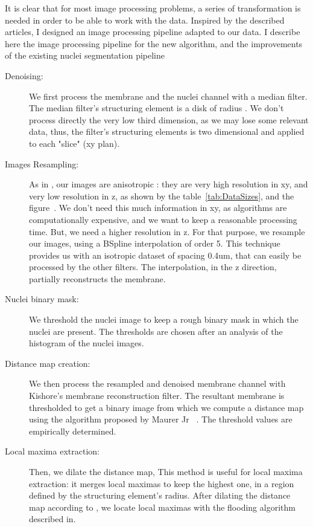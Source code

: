 It is clear that for most image processing problems, a series of transformation is needed in order to be able to work with the data.
Inspired by the described articles, I designed an image processing pipeline adapted to our data.
I describe here the image processing pipeline for the new algorithm, and the improvements of the existing nuclei segmentation pipeline
\begin{description}
  \item[Denoising: ] We first process the membrane and the nuclei channel with a median filter. The median filter's structuring element is a disk of radius
  .
  We don't process directly the very low third dimension, as we may lose some relevant data,
  thus, the filter's structuring elements is two dimensional and applied to each "slice" (xy plan).
%
%
  \item[Images Resampling: ] As in \cite{li20073}, our images are anisotropic : they are very high resolution in xy, and very low resolution in z, as shown by the
  table~\ref{tab:DataSizes}, and the figure~.
  We don't need this much information in xy, as algorithms are computationally expensive, and we want to keep a reasonable processing time.
  But, we need a higher resolution in z.
  For that purpose, we resample our images, using a BSpline interpolation of order 5.
  This technique provides us with an isotropic dataset of spacing 0.4um, that can easily be
  processed by the other filters. The interpolation, in the z direction, partially reconstructs the membrane.
%
%
  \item[Nuclei binary mask: ] We threshold the nuclei image to keep a rough binary mask in which the nuclei are present.
  The thresholds are chosen after an analysis of the histogram of the nuclei images.
%  
%
%  
  \item[Distance map creation: ] We then process the resampled and denoised membrane channel with Kishore's membrane reconstruction filter.
  The resultant membrane is thresholded to get a binary image from which we compute a distance map
  using the algorithm proposed by Maurer Jr {\etal}~\cite{maurer2003linear}.
  The threshold values are empirically determined.
%  
%
%
  \item[Local maxima extraction: ] Then, we dilate the distance map, This method is useful for local maxima extraction:
  it merges local maximas to keep the highest one, in a region defined by the structuring element's radius.
  After dilating the distance map according to , we locate local maximas with the flooding algorithm described in\cite{beare2005finding}.
%  
%
%
\end{description}


